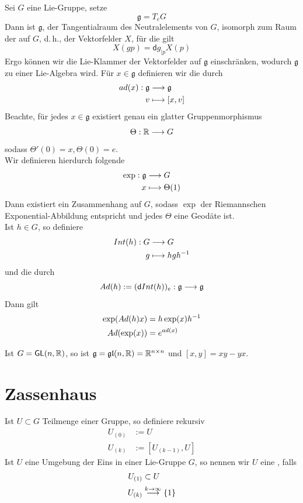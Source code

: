 \documentclass{book}
\renewcommand{\d}{\textsf{d}}
\newcommand{\g}{\mathfrak{g}}
\newcommand{\GL}{\textsf{GL}(n,\R)}
\newcommand{\glf}{\mathfrak{gl}(n,\R)}
\begin{document}
\Bem{}
Sei $G$ eine Lie-Gruppe, setze
\[ \g = T_eG \]
Dann ist $\g$, der Tangentialraum des Neutralelements von $G$, isomorph zum Raum der  auf $G$, d.\,h., der Vektorfelder $X$, für die gilt
\[ X(gp) = \d g_{|p}X(p) \]
Ergo können wir die Lie-Klammer der Vektorfelder auf $\g$ einschränken, wodurch $\g$ zu einer Lie-Algebra wird. Für $x\in\g$ definieren wir die  durch
\begin{align*}
ad(x) : \g & \Pfeil{} \g\\
v & \longmapsto [x,v]
\end{align*}
Beachte, für jedes $x \in \g$ existiert genau ein glatter Gruppenmorphismus
\[ \Theta : \mathbb{R} \overset{}{\longrightarrow} G \]
sodass $\Theta'(0) = x, \Theta(0) = e$.\\
Wir definieren hierdurch folgende 
\begin{align*}
\exp : \g &\Pfeil{} G\\
x &\longmapsto \Theta(1)
\end{align*}
Dann existiert ein Zusammenhang auf $G$, sodass $\exp$ der Riemannschen Exponential-Abbildung entspricht und jedes $\Theta$ eine Geodäte ist.\\
Ist $h\in G$, so definiere
\begin{align*}
Int(h) :G& \overset{}{\longrightarrow} G\\
g & \longmapsto hgh^{-1}
\end{align*}
und die  durch
\[ Ad(h) := (\d Int(h))_{e} : \g \Pfeil{} \g \]
Dann gilt
\begin{align*}
\exp(Ad(h)x) &= h\exp(x)h^{-1}\\
Ad(\exp(x)) &= e^{ad(x)}
\end{align*}

\Bem{}
Ist $G = \GL$, so ist $\g = \glf = \R^{n\times n}$ und $[x,y] = xy -yx$. 



\section{Zassenhaus}
\Def{}
Ist $U \subset G$ Teilmenge einer Gruppe, so definiere rekursiv
\begin{align*}
U_{(0)} &:= U\\
U_{(k)} &:= [U_{(k-1)}, U]
\end{align*}
Ist $U$ eine Umgebung der Eins in einer Lie-Gruppe $G$, so nennen wir $U$ eine , falls
\begin{align*}
U_{(1)} &\subset U\\
U_{(k)} &\overset{k \overset{{}}{\rightarrow} \infty}{\longrightarrow} \{1\}
\end{align*}
\end{document}
